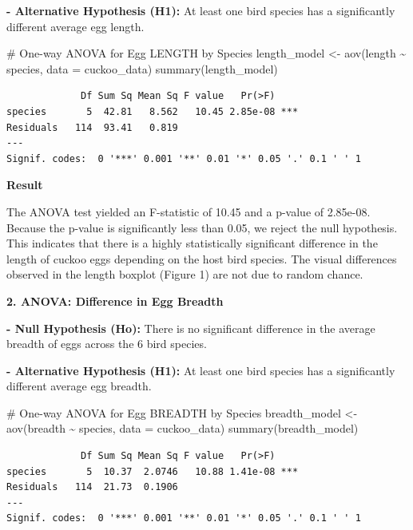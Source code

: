 \documentclass[
  letterpaper,
  DIV=11,
  numbers=noendperiod]{scrartcl}
\newenvironment{Shaded}{\begin{snugshade}}{\end{snugshade}}
\newcommand{\AttributeTok}[1]{\textcolor[rgb]{0.40,0.45,0.13}{#1}}
\newcommand{\CommentTok}[1]{\textcolor[rgb]{0.37,0.37,0.37}{#1}}
\newcommand{\FunctionTok}[1]{\textcolor[rgb]{0.28,0.35,0.67}{#1}}
\newcommand{\NormalTok}[1]{\textcolor[rgb]{0.00,0.23,0.31}{#1}}
\newcommand{\OtherTok}[1]{\textcolor[rgb]{0.00,0.23,0.31}{#1}}
\newcommand{\SpecialCharTok}[1]{\textcolor[rgb]{0.37,0.37,0.37}{#1}}
\begin{document}
\textbf{- Alternative Hypothesis (H1):} At least one bird species has a
significantly different average egg length.

\begin{Shaded}
\begin{Highlighting}[]
\CommentTok{\# One{-}way ANOVA for Egg LENGTH by Species}
\NormalTok{length\_model }\OtherTok{\textless{}{-}} \FunctionTok{aov}\NormalTok{(length }\SpecialCharTok{\textasciitilde{}}\NormalTok{ species, }\AttributeTok{data =}\NormalTok{ cuckoo\_data)}
\FunctionTok{summary}\NormalTok{(length\_model)}
\end{Highlighting}
\end{Shaded}

\begin{verbatim}
             Df Sum Sq Mean Sq F value   Pr(>F)    
species       5  42.81   8.562   10.45 2.85e-08 ***
Residuals   114  93.41   0.819                     
---
Signif. codes:  0 '***' 0.001 '**' 0.01 '*' 0.05 '.' 0.1 ' ' 1
\end{verbatim}

\textbf{Result}

The ANOVA test yielded an F-statistic of 10.45 and a p-value of
2.85e-08. Because the p-value is significantly less than 0.05, we reject
the null hypothesis. This indicates that there is a highly statistically
significant difference in the length of cuckoo eggs depending on the
host bird species. The visual differences observed in the length boxplot
(Figure 1) are not due to random chance.

\textbf{2. ANOVA: Difference in Egg Breadth}

\textbf{- Null Hypothesis (Ho):} There is no significant difference in
the average breadth of eggs across the 6 bird species.

\textbf{- Alternative Hypothesis (H1):} At least one bird species has a
significantly different average egg breadth.

\begin{Shaded}
\begin{Highlighting}[]
\CommentTok{\# One{-}way ANOVA for Egg BREADTH by Species}
\NormalTok{breadth\_model }\OtherTok{\textless{}{-}} \FunctionTok{aov}\NormalTok{(breadth }\SpecialCharTok{\textasciitilde{}}\NormalTok{ species, }\AttributeTok{data =}\NormalTok{ cuckoo\_data)}
\FunctionTok{summary}\NormalTok{(breadth\_model)}
\end{Highlighting}
\end{Shaded}

\begin{verbatim}
             Df Sum Sq Mean Sq F value   Pr(>F)    
species       5  10.37  2.0746   10.88 1.41e-08 ***
Residuals   114  21.73  0.1906                     
---
Signif. codes:  0 '***' 0.001 '**' 0.01 '*' 0.05 '.' 0.1 ' ' 1
\end{verbatim}
\end{document}
